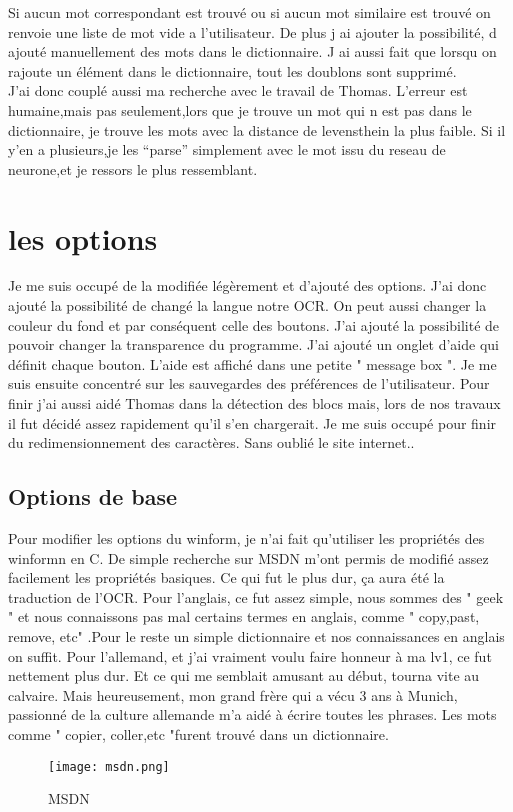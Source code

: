 \documentclass{article}
\begin{document}
Si aucun mot correspondant est trouvé ou si aucun mot similaire est trouvé on renvoie une liste de mot vide a l’utilisateur. De plus j ai ajouter la possibilité, d ajouté manuellement des mots dans le dictionnaire. J ai aussi fait que lorsqu on rajoute un élément dans le dictionnaire, tout les doublons sont supprimé.\\
J’ai donc couplé aussi ma recherche avec le travail de Thomas. L’erreur est humaine,mais pas seulement,lors que je trouve un mot qui n est pas dans le dictionnaire, je trouve les mots avec la distance de levensthein la plus faible. Si il y’en a plusieurs,je les “parse” simplement  avec le mot issu du reseau de neurone,et je ressors le  plus ressemblant.


       \section{les options}
 Je me suis occupé de la modifiée légèrement et d’ajouté des options. J’ai donc ajouté la possibilité de changé la langue notre OCR. On peut aussi changer la couleur du fond et par conséquent celle des boutons. J’ai ajouté la possibilité de pouvoir changer la transparence du programme. J’ai ajouté un onglet d’aide qui définit chaque bouton. L’aide est affiché dans une petite " message box ". Je me suis ensuite concentré sur les sauvegardes des préférences de l’utilisateur. Pour finir j’ai aussi aidé Thomas dans la détection des blocs mais, lors de nos travaux il fut décidé assez rapidement qu’il s’en chargerait. Je me suis occupé pour finir du redimensionnement des caractères. Sans oublié le site internet..
                \subsection{Options de base}
Pour modifier les options du winform, je n’ai fait qu’utiliser les propriétés des winformn en C. De simple recherche sur MSDN m’ont permis de modifié assez facilement les propriétés basiques. Ce qui fut le plus dur, ça aura été la traduction de l’OCR. Pour l’anglais, ce fut assez simple, nous sommes des " geek " et nous connaissons pas mal certains termes en anglais, comme " copy,past, remove, etc" .Pour le reste un simple dictionnaire et nos connaissances en anglais on suffit. Pour l’allemand, et j’ai vraiment voulu faire honneur à ma lv1, ce fut nettement plus dur. Et ce qui me semblait amusant au début, tourna vite au calvaire. Mais heureusement, mon grand frère qui a vécu 3 ans à Munich, passionné de la culture allemande m’a aidé à écrire toutes les phrases. Les mots comme " copier, coller,etc "furent trouvé dans un dictionnaire.
\\
    \begin{figure}[hp]
	    \centering
	    \texttt{[image: msdn.png]}
	    \caption{MSDN}
    \end{figure}
\\
\end{document}
